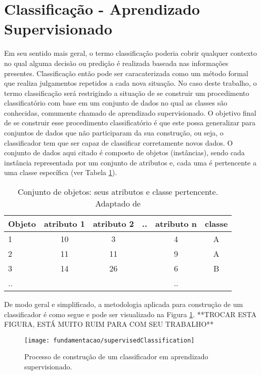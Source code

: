 \section{Classificação - Aprendizado Supervisionado}
Em seu sentido mais geral, o termo classificação poderia cobrir qualquer contexto no qual alguma decisão ou predição é realizada baseada nas informações presentes. Classificação então pode ser caracaterizada como um método formal que realiza julgamentos repetidos a cada nova situação. No caso deste trabalho, o termo classificação será restrigindo a situação de se construir um procedimento classificatório com base em um conjunto de dados no qual as classes são conhecidas, comumente chamado de aprendizado supervisionado\cite{Michie:1994}. O objetivo final de se construir esse procedimento classificatório é que este possa generalizar para conjuntos de dados que não participaram da sua construção, ou seja, o classificador tem que ser capaz de classificar corretamente novos dados\cite{Kotsiantis:2007}. O conjunto de dados aqui citado é composto de objetos (instâncias), sendo cada instância representada por um conjunto de atributos e, cada uma é pertencente a uma classe específica (ver Tabela \ref{table:dsex1}).

\begin{table}[!htp]
  \centering
  \begin{tabular}{ |l|c c c c |c|}
    \hline
       {\bf Objeto} & {\bf atributo 1} & {\bf atributo 2} & {\bf ..} & {\bf atributo n} & {\bf classe} \\
    \hline
       1 & 10 & 3 &  & 4 & A \\
    \hline
       2 & 11 & 11 &  & 9 & A \\
    \hline
       3 & 14 & 26 &  & 6 & B \\
    \hline
       .. &  &  &  & .. & \\
    \hline
  \end{tabular}
  \caption{Conjunto de objetos: seus atributos e classe pertencente. Adaptado de \cite{Kotsiantis:2007}}
  \label{table:dsex1}
\end{table}

De modo geral e simplificado, a metodologia aplicada para construção de um classificador é como segue e pode ser visualizado na Figura \ref{fig:slclassification}.
**TROCAR ESTA FIGURA, ESTÁ MUITO RUIM PARA COM SEU TRABALHO**
\begin{figure}[!htb] \centering 
  \centering
  \texttt{[image: fundamentacao/supervisedClassification]} 
  \caption{Processo de construção de um classificador em aprendizado supervisionado.\cite{Kotsiantis:2007}} 
  \label{fig:slclassification}
\end{figure}

